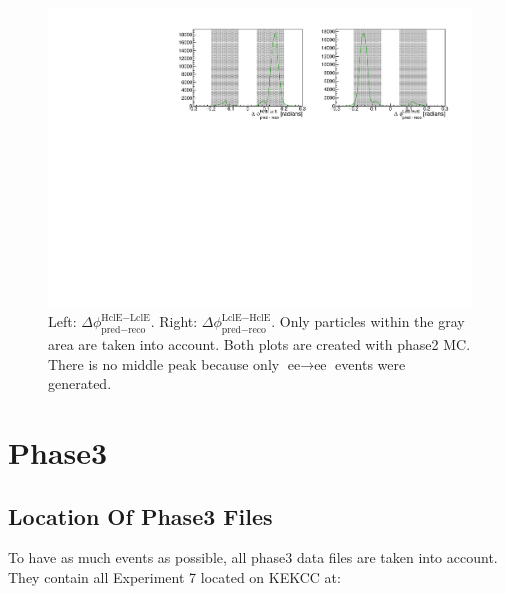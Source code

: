 \documentclass[a4paper,11pt,twosided,final,german,openbib,pdftex,listof=totoc,bibliography=totoc]{scrbook}
\begin{document}
\begin{appendix}
\begin{figure}[h!]
	\centering
	\includegraphics[width=\textwidth]{Plots/master/hb2b_MC.pdf}
	\caption[b2bClusterPhi - clusterPhi For Phase2 MC]{Left: $\Delta \phi _{\textrm{pred} - \textrm{reco}}^{\textrm{HclE}-\textrm{LclE}}$. Right:  $\Delta \phi _{\textrm{pred} - \textrm{reco}}^{\textrm{LclE}-\textrm{HclE}}$. Only particles within the gray area are taken into account. Both plots are created with phase2 MC. There is no middle peak because only $\textrm{ee} \rightarrow \textrm{ee}$ events were generated.}
	\label{fig:b2bMC2}
\end{figure}



















\clearpage
\section{Phase3}


\subsection{Location Of Phase3 Files}



To have as much events as possible, all phase3 data files are taken into account. They contain all Experiment 7 located on KEKCC at:
\newline


\end{appendix}
\end{document}
